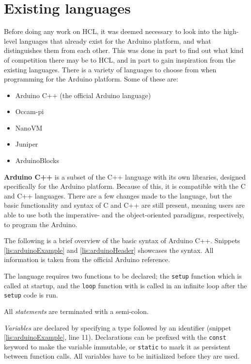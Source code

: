 \section{Existing languages}
Before doing any work on HCL, it was deemed necessary to look into the high-level languages that already exist for the Arduino platform, and what distinguishes them from each other.
This was done in part to find out what kind of competition there may be to HCL, and in part to gain inspiration from the existing languages.
There is a variety of languages to choose from when programming for the Arduino platform.
Some of these are:

\begin{itemize}
	\item Arduino C++ (the official Arduino language)
	\item Occam-pi
	\item NanoVM
	\item Juniper
	\item ArduinoBlocks
\end{itemize}

\label{arduinoC}
\textbf{Arduino C++} is a subset of the C++ language with its own libraries, designed specifically for the Arduino platform.
Because of this, it is compatible with the C and C++ languages.
There are a few changes made to the language, but the basic functionality and syntax of C and C++ are still present, meaning users are able to use both the imperative- and the object-oriented paradigms, respectively, to program the Arduino.

The following is a brief overview of the basic syntax of Arduino C++.
Snippets \ref{lis:arduinoExample} and \ref{lis:arduinoHeader} showcases the syntax.
All information is taken from the official Arduino reference\cite{ArduinoReference}.

The language requires two functions to be declared;
the \texttt{setup} function which is called at startup,
and the \texttt{loop} function with is called in an infinite loop after the \texttt{setup} code is run.

All \textit{statements} are terminated with a semi-colon.

\textit{Variables} are declared by specifying a type followed by an identifier (snippet \ref{lis:arduinoExample}, line 11).
Declarations can be prefixed with the \texttt{const} keyword to make the variable immutable, or \texttt{static} to mark it as persistent between function calls.
All variables have to be initialized before they are used. 

